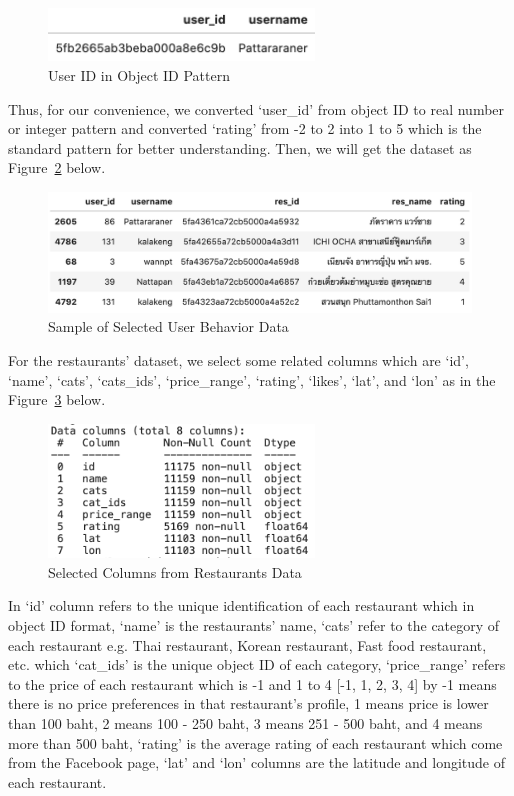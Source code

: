 \documentclass[12pt,oneside,openright,a4paper]{cpe-english-project}
\begin{document}
\begin{figure}[H]\centering
\includegraphics[width=200pt]{./images/4UserIDinObjectIDPattern.png}
\caption{User ID in Object ID Pattern}\label{fig:4UserIDinObjectIDPattern}
\end{figure}

Thus, for our convenience, we converted ‘user\_id’ from object ID to real number or integer pattern and converted ‘rating’ from -2 to 2 into 1 to 5 which is the standard pattern for better understanding. Then, we will get the dataset as Figure~\ref{fig:4SampleofSelectedUserBehaviorData} below.

\begin{figure}[H]\centering
\includegraphics[width=350pt]{./images/4SampleofSelectedUserBehaviorData.png}
\caption{Sample of Selected User Behavior Data}\label{fig:4SampleofSelectedUserBehaviorData}
\end{figure}

For the restaurants’ dataset, we select some related columns which are ‘id’, ‘name’, ‘cats’, ‘cats\_ids’, ‘price\_range’, ‘rating’, ‘likes’, ‘lat’, and ‘lon’ as in the Figure~\ref{fig:4SelectedColumnsfromRestaurantsData}  below.

\begin{figure}[H]\centering
\includegraphics[width=200pt]{./images/4SelectedColumnsfromRestaurantsData.png}
\caption{Selected Columns from Restaurants Data}\label{fig:4SelectedColumnsfromRestaurantsData}
\end{figure}

In ‘id’ column refers to the unique identification of each restaurant which in object ID format, ‘name’ is the restaurants’ name, ‘cats’ refer to the category of each restaurant e.g. Thai restaurant, Korean restaurant, Fast food restaurant, etc. which ‘cat\_ids’ is the unique object ID of each category, ‘price\_range’ refers to the price of each restaurant which is -1 and 1 to 4 [-1, 1, 2, 3, 4] by -1 means there is no price preferences in that restaurant’s profile, 1 means price is lower than 100 baht, 2 means 100 - 250 baht, 3 means 251 - 500 baht, and 4 means more than 500 baht, ‘rating’ is the average rating of each restaurant which come from the Facebook page, ‘lat’ and ‘lon’ columns are the latitude and longitude of each restaurant.
\end{document}
